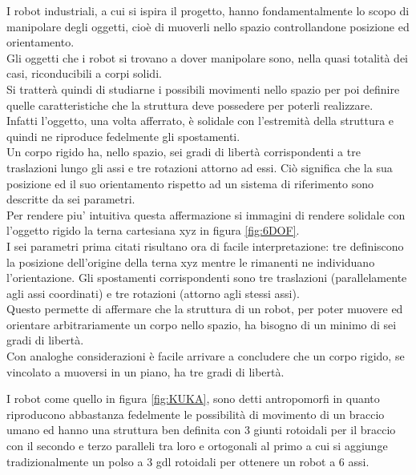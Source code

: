 \documentclass[%
corpo=11pt,
twoside,
 stile=classica,
oldstyle,
greek,%
]{toptesi}
\begin{document}
	 
	 I robot industriali, a cui si ispira il progetto, hanno fondamentalmente lo scopo di manipolare degli oggetti, cioè di muoverli nello spazio controllandone posizione ed orientamento.\\
	  Gli oggetti che i robot si trovano a dover manipolare sono, nella quasi totalità dei casi, riconducibili a corpi solidi. \\
	  Si tratterà quindi di studiarne i possibili movimenti nello spazio per poi definire quelle caratteristiche che la struttura deve possedere per poterli realizzare. \\
	  Infatti l'oggetto, una volta afferrato, è solidale con l'estremità della struttura e quindi ne riproduce fedelmente gli spostamenti. \\
	 Un corpo rigido ha, nello spazio, sei gradi di libertà corrispondenti a tre traslazioni lungo gli assi e tre rotazioni attorno ad essi. 
	 Ciò significa che la sua posizione ed il suo orientamento rispetto ad un sistema di riferimento sono descritte da sei parametri. \\
	 Per rendere piu' intuitiva questa affermazione si immagini di rendere solidale con l'oggetto rigido la terna cartesiana xyz in figura \ref{fig:6DOF}. \\
	 I sei parametri prima citati risultano ora di facile interpretazione: tre definiscono la posizione dell'origine della terna xyz mentre le rimanenti ne individuano l'orientazione. Gli spostamenti corrispondenti sono tre traslazioni (parallelamente agli assi coordinati) e tre rotazioni (attorno agli stessi assi).\\
	  Questo permette di affermare che la struttura di un robot, per poter muovere ed orientare arbitrariamente un corpo nello spazio, ha bisogno di un minimo di sei gradi di libertà. \\
	  Con analoghe considerazioni è facile arrivare a concludere che un corpo rigido, se vincolato a muoversi in un piano, ha tre gradi di libertà. 
	  
	 
	 
	 I robot come quello in figura \ref{fig:KUKA}, sono detti antropomorfi in quanto riproducono abbastanza fedelmente le possibilità di movimento di un braccio umano ed hanno una struttura ben definita con 3 giunti rotoidali per il braccio con il secondo e terzo paralleli tra loro e ortogonali al primo a cui si aggiunge tradizionalmente un polso a 3 gdl rotoidali per ottenere un robot a 6 assi.\\ 
	 
\end{document}
